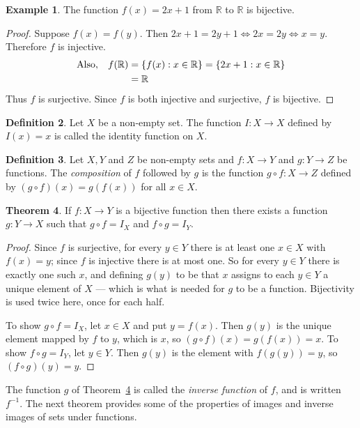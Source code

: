 \documentclass[11pt,a4paper]{article}
\theoremstyle{definition}
\newtheorem{thm}{Theorem}[subsection]
\newtheorem{defn}[thm]{Definition}
\newtheorem{exa}[thm]{Example}
\begin{document}
\begin{exa}
The function $f(x)=2x+1$ from $\mathbb{R}$ to $\mathbb{R}$ is bijective.
\end{exa}


\begin{proof}
Suppose $f(x)=f(y)$. Then $2x+1=2y+1\iff 2x=2y\iff x=y$. Therefore $f$ is injective.
\begin{align*}
\text{Also},\hspace{0.3cm} f(\mathbb{R}) &=\{f(x):x\in \mathbb{R}\}=\{2x+1:x\in \mathbb{R}\}\\
&=\mathbb{R}
\end{align*}
Thus $f$ is surjective. Since $f$ is both injective and surjective, $f$ is
bijective.
\end{proof}


\begin{defn}
Let $X$ be a non-empty set. The function $I:X\longrightarrow X$ defined by $I(x)=x$ is called the identity function on $X$.
\end{defn}
\begin{defn}
Let $X,Y$ and $Z$ be non-empty sets and $f:X\longrightarrow Y$ and
$g:Y\longrightarrow Z$ be functions. The \emph{composition} of $f$ followed by
$g$ is the function $g\circ f:X\longrightarrow Z$ defined by
$(g\circ f)(x)=g(f(x))$ for all $x\in X$.
\end{defn}
\begin{thm}\label{thm:inverse-exists}
If $f:X\longrightarrow Y$ is a bijective function then there exists a function
$g:Y\longrightarrow X$ such that $g\circ f=I_X$ and $f\circ g=I_Y$.
\end{thm}
\begin{proof}
Since $f$ is surjective, for every $y\in Y$ there is at least one $x\in X$ with
$f(x)=y$; since $f$ is injective there is at most one. So for every $y\in Y$
there is exactly one such $x$, and defining $g(y)$ to be that $x$ assigns to
each $y\in Y$ a unique element of $X$ --- which is what is needed for $g$ to be
a function. Bijectivity is used twice here, once for each half.

To show $g\circ f=I_X$, let $x\in X$ and put $y=f(x)$. Then $g(y)$ is the
unique element mapped by $f$ to $y$, which is $x$, so
$(g\circ f)(x)=g(f(x))=x$. To show $f\circ g=I_Y$, let $y\in Y$. Then
$g(y)$ is the element with $f(g(y))=y$, so $(f\circ g)(y)=y$.
\end{proof}
The function $g$ of Theorem~\ref{thm:inverse-exists} is called the
\emph{inverse function} of $f$, and is written $f^{-1}$.
The next theorem provides some of the properties of images and inverse images of sets under functions.
\end{document}
